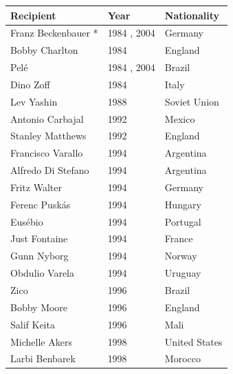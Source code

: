 \documentclass{article}
\begin{document}
\begin{tabular}{lll}
\toprule
Recipient & Year & Nationality \\
\midrule
Franz Beckenbauer * & 1984 , 2004 & Germany \\
Bobby Charlton & 1984 & England \\
Pelé & 1984 , 2004 & Brazil \\
Dino Zoff & 1984 & Italy \\
Lev Yashin & 1988 & Soviet Union \\
Antonio Carbajal & 1992 & Mexico \\
Stanley Matthews & 1992 & England \\
Francisco Varallo & 1994 & Argentina \\
Alfredo Di Stefano & 1994 & Argentina \\
Fritz Walter & 1994 & Germany \\
Ferenc Puskás & 1994 & Hungary \\
Eusébio & 1994 & Portugal \\
Just Fontaine & 1994 & France \\
Gunn Nyborg & 1994 & Norway \\
Obdulio Varela & 1994 & Uruguay \\
Zico & 1996 & Brazil \\
Bobby Moore & 1996 & England \\
Salif Keita & 1996 & Mali \\
Michelle Akers & 1998 & United States \\
Larbi Benbarek & 1998 & Morocco \\
\bottomrule
\end{tabular}
\end{document}
